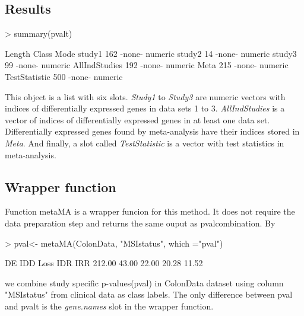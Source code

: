 \documentclass[a4paper]{report}
\begin{document}
\subsection*{Results}
\begin{Schunk}
\begin{Sinput}
> summary(pvalt)
\end{Sinput}
\begin{Soutput}
              Length Class  Mode   
study1        162    -none- numeric
study2         14    -none- numeric
study3         99    -none- numeric
AllIndStudies 192    -none- numeric
Meta          215    -none- numeric
TestStatistic 500    -none- numeric
\end{Soutput}
\end{Schunk}
This object is a list with six slots. \emph{Study1} to \emph{Study3} are numeric vectors with indices of differentially expressed genes in data sets 1 to 3. \emph{AllIndStudies} is a vector of indices of differentially expressed genes in at least one data set. Differentially expressed genes found by meta-analysis have their indices stored in \emph{Meta}. And finally, a slot called \emph{TestStatistic} is a vector with test statistics in meta-analysis.  
\subsection*{Wrapper function}
Function {\ttfamily metaMA} is a wrapper funcion for this method. It does not require the data preparation step and returns the same ouput as {\ttfamily pvalcombination}. By
\begin{Schunk}
\begin{Sinput}
> pval<- metaMA(ColonData, "MSIstatus", which ="pval")
\end{Sinput}
\begin{Soutput}
    DE    IDD   Loss    IDR    IRR 
212.00  43.00  22.00  20.28  11.52 
\end{Soutput}
\end{Schunk}
we combine study specific p-values({\ttfamily pval}) in {\ttfamily ColonData} dataset using column {\ttfamily "MSIstatus"} from clinical data as class labels. The only difference between {\ttfamily pval} and {\ttfamily pvalt} is the \emph{gene.names} slot in the wrapper function.
\end{document}

